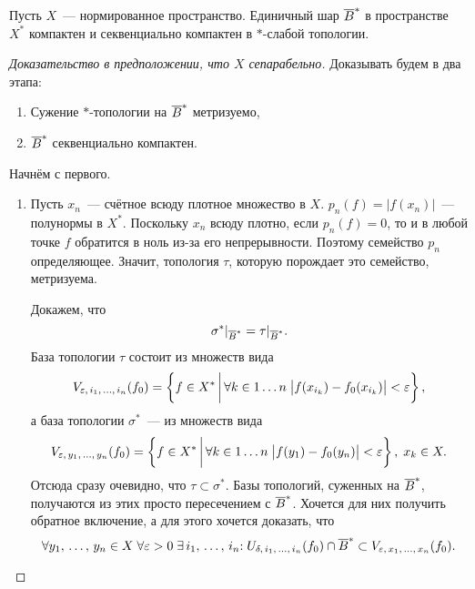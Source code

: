 \documentclass{notes}
\newcommand{\ta}{$*$}
\newcommand{\ssph}{\ov{B}^*}
\begin{document}
	\begin{thm}
		Пусть $X$~--- нормированное пространство. Единичный шар $\ssph$ в пространстве $X^*$ компактен и секвенциально компактен в \ta-слабой топологии. 

		\begin{proof}[Доказательство в предположении, что $X$ сепарабельно]
			Доказывать будем в два этапа:
			\begin{enumerate}
				\item Сужение \ta-топологии на $\ssph$ метризуемо,
				\item $\ssph$ секвенциально компактен.
			\end{enumerate}
			Начнём с первого.
			\begin{enumerate}
				\item Пусть $x_n$~--- счётное всюду плотное множество в $X$. $p_n(f) = \big|f(x_n)\big|$~--- полунормы в $X^*$. Поскольку $x_n$ всюду плотно, если $p_n(f) = 0$, то и в любой точке $f$ обратится в ноль из-за его непрерывности. Поэтому семейство $p_n$ определяющее. Значит, топология $\tau$, которую порождает это семейство, метризуема.

				Докажем, что
				\[
					\sigma^*|_{\ssph} = \tau|_{\ssph}.
				\]
				База топологии $\tau$ состоит из множеств вида
				\[
					V_{\varepsilon, \, i_1, \, \ldots, \, i_n}(f_0) = \left\{f \in X^* \, \bigg | \, \forall k \in 1\ldots n \; \big|f(x_{i_k}) - f_0(x_{i_k})\big| < \varepsilon \right\},
				\]
				а база топологии $\sigma^*$~--- из множеств вида
				\[
					V_{\varepsilon, \, y_1, \, \ldots, \, y_n}(f_0) = \left\{f \in X^* \, \bigg | \, \forall k \in 1\ldots n \; \big|f(y_1) - f_0(y_n)\big| < \varepsilon \right\}, \; x_k \in X.
				\]
				Отсюда сразу очевидно, что $\tau \subset \sigma^*$.
				Базы топологий, суженных на $\ssph$, получаются из этих просто пересечением с $\ssph$. Хочется для них получить обратное включение, а для этого хочется доказать, что
				\[
					\all y_1, \, \ldots, \, y_n \in X \; \all \varepsilon > 0 \; \ex i_1, \, \ldots, \, i_n \col \; U_{\delta, \, i_1, \, \ldots, \, i_n}(f_0) \cap \ssph \subset V_{\varepsilon, \, x_1, \, \ldots, \, x_n}(f_0).
				\]


\end{enumerate}
\end{proof}
\end{thm}
\end{document}
